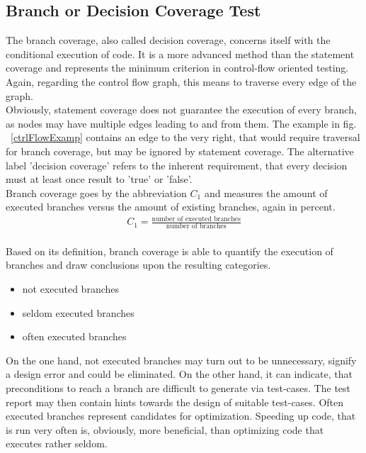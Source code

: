 	\subsection{Branch or Decision Coverage Test}
	The branch coverage, also called decision coverage, concerns itself with the conditional execution of code. It is a more advanced method than the statement coverage and represents the minimum criterion in control-flow oriented testing. Again, regarding the control flow graph, this means to traverse every edge of the graph. \\ Obviously, statement coverage does not guarantee the execution of every branch, as nodes may have multiple edges leading to and from them. The example in fig. ~\ref{ctrlFlowExamp} contains an edge to the very right, that would require traversal for branch coverage, but may be ignored by statement coverage. The alternative label 'decision coverage' refers to the inherent requirement, that every decision must at least once result to 'true' or 'false'. \\
	Branch coverage goes by the abbreviation $C_1$ and measures the amount of executed branches versus the amount of existing branches, again in percent.
		\begin{align*}
		C_1 = \frac{\textrm{number of executed branches}}{\textrm{number of branches}}
		\end{align*} \\
	Based on its definition, branch coverage is able to quantify the execution of branches and draw conclusions upon the resulting categories. \\
	\begin{itemize} \setlength\itemsep{1px}
	\item not executed branches
	\item seldom executed branches
	\item often executed branches \\
	\end{itemize} 

	On the one hand, not executed branches may turn out to be unnecessary, signify a design error and could be eliminated. On the other hand, it can indicate, that preconditions to reach a branch are difficult to generate via test-cases. The test report may then contain hints towards the design of suitable test-cases. Often executed branches represent candidates for optimization. Speeding up code, that is run very often is, obviously, more beneficial, than optimizing code that executes rather seldom. \\

